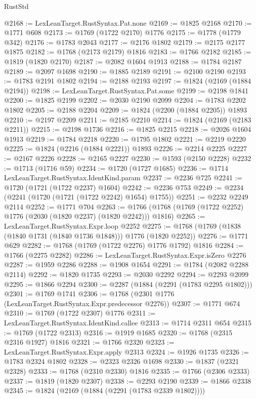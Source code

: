 \begin{lexlean}{RustStd}
\begin{coremodule}
@2168 := LexLeanTarget.RustSyntax.Pat.none
@2169 := @1825 @2168
@2170 := @1771 @608
@2173 := @1769 (@1722 @2170) @1776
@2175 := @1778 (@1779 @342)
@2176 := @1783 @2043
@2177 := @2176 @1802
@2179 := @2175 @2177 @1875
@2182 := @1768 (@2173 @2179) @1816
@2183 := @1766 @2182
@2185 := @1819 (@1820 @2170)
@2187 := @2082 @1604 @1913
@2188 := @1784 @2187
@2189 := @2097 @1698
@2190 := @1885 @2189
@2191 := @2100 @2190
@2193 := @1783 @2191 @1802
@2194 := @2188 @2193
@2197 := @1824 (@2169 (@1884 @2194))
@2198 := LexLeanTarget.RustSyntax.Pat.some
@2199 := @2198 @1841
@2200 := @1825 @2199
@2202 := @2030 @2190 @2099
@2204 := @1783 @2202 @1802
@2205 := @2188 @2204
@2209 := @1824 (@2200 (@1884 @2205)) @1893
@2210 := @2197 @2209
@2211 := @2185 @2210
@2214 := @1824 (@2169 (@2183 @2211))
@2215 := @2198 @1736
@2216 := @1825 @2215
@2218 := @2026 @1604 @1913
@2219 := @1784 @2218
@2220 := @1795 @1802
@2221 := @2219 @2220
@2225 := @1824 (@2216 (@1884 @2221)) @1893
@2226 := @2214 @2225
@2227 := @2167 @2226
@2228 := @2165 @2227
@2230 := @1593 (@2150 @2228)
@2232 := @1713 (@1716 @59)
@2234 := @1720 (@1727 @1685)
@2236 := @1714 LexLeanTarget.RustSyntax.IdentKind.param
@2237 := @2236 @725
@2241 := @1720 (@1721 (@1722 @2237) @1604)
@2242 := @2236 @753
@2249 := @2234 (@2241 (@1720 (@1721 (@1722 @2242) @1654) @1755))
@2251 := @2232 @2249 @2114
@2252 := @1771 @704
@2263 := @1766 (@1768 (@1769 (@1722 @2252) @1776 (@2030 (@1820 @2237) (@1820 @2242))) @1816)
@2265 := LexLeanTarget.RustSyntax.Expr.loop @2252
@2275 := @1768 (@1769 (@1838 (@1840 @1731 (@1840 @1736 @1848))) @1776 (@1820 @2252))
@2276 := @1771 @629
@2282 := @1768 (@1769 (@1722 @2276) @1776 @1792) @1816
@2284 := @1766 (@2275 @2282)
@2286 := LexLeanTarget.RustSyntax.Expr.isZero @2276
@2287 := @1959 @2286
@2288 := @1908 @1654
@2291 := @1784 (@2082 @2288 @2114)
@2292 := @1820 @1735
@2293 := @2030 @2292
@2294 := @2293 @2099
@2295 := @1866 @2294
@2300 := @2287 (@1884 (@2291 (@1783 @2295 @1802)))
@2301 := @1769 @1741
@2306 := @1768 (@2301 @1776 (LexLeanTarget.RustSyntax.Expr.predecessor @2276))
@2307 := @1771 @674
@2310 := @1769 (@1722 @2307) @1776
@2311 := LexLeanTarget.RustSyntax.IdentKind.callee
@2313 := @1714 @2311 @654
@2315 := @1769 (@1722 @2313)
@2316 := @1919 @1685
@2320 := @1768 (@2315 @2316 @1927) @1816
@2321 := @1766 @2320
@2323 := LexLeanTarget.RustSyntax.Expr.apply @2313
@2324 := @1926 @1735
@2326 := @1783 @2324 @1802
@2328 := @2323 @2326 @1698
@2330 := @1837 (@2321 @2328)
@2333 := @1768 (@2310 @2330) @1816
@2335 := @1766 (@2306 @2333)
@2337 := @1819 (@1820 @2307)
@2338 := @2293 @2190
@2339 := @1866 @2338
@2345 := @1824 (@2169 (@1884 (@2291 (@1783 @2339 @1802))))

\end{coremodule}
\end{lexlean}
